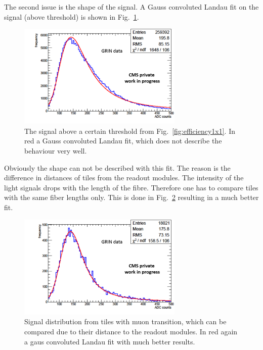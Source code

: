 			The second issue is the shape of the signal.
			A Gauss convoluted Landau fit on the signal (above threshold) is shown in Fig.\ \ref{fig:langaus_bad}.
			\begin{figure}[htbp]
				\centering
				\includegraphics[width=0.70\textwidth]{Figures/erdogan/langaus_bad.png}
				\caption{The signal above a certain threshold from Fig.\ \ref{fig:efficiency1x1}. In red a Gauss convoluted Landau fit, which does not describe the behaviour very well.}
				\label{fig:langaus_bad}
			\end{figure}
			Obviously the shape can not be described with this fit.
			The reason is the difference in distances of tiles from the readout modules.
			The intensity of the light signals drops with the length of the fibre.
			Therefore one has to compare tiles with the same fiber lengths only.
			This is done in Fig.\ \ref{fig:langaus_good} resulting in a much better fit.
			\begin{figure}[htbp]
				\centering
				\includegraphics[width=0.70\textwidth]{Figures/erdogan/langaus_good.png}
				\caption{Signal distribution from tiles with muon transition, which can be compared due to their distance to the readout modules. In red again a gaus convoluted Landau fit with much better
				results.}
				\label{fig:langaus_good}
			\end{figure}
